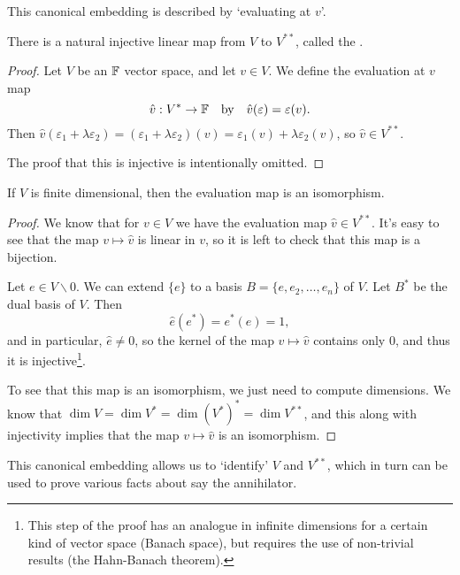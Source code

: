 \documentclass[a4paper]{scrartcl}
\begin{document}
\begin{center}
\begin{tikzpicture}[x=0.75pt,y=0.75pt,yscale=-1,xscale=1]
\end{tikzpicture}

\end{center}

This canonical embedding is described by `evaluating at $v$'.

\begin{theorem}
    There is a natural injective linear map from $V$ to $V^{**}$, called the .
\end{theorem}
\begin{proof}
Let $V$ be an $\F$ vector space, and let $v \in V$.
We define the evaluation at $v$ map
$$
\hat{v}: V^* \rightarrow \F \quad \text{by} \quad \hat{v}(\varepsilon) = \varepsilon(v).
$$
Then $\hat{v}(\varepsilon_1 + \lambda \varepsilon_2) = (\varepsilon_1 + \lambda \varepsilon_2)(v) = \varepsilon_1(v) + \lambda \varepsilon_2(v)$, so $\hat{v} \in V^{**}$.

The proof that this is injective is intentionally omitted.
\end{proof}


\begin{theorem}
    If $V$ is finite dimensional, then the evaluation map is an isomorphism.
\end{theorem}
\begin{proof}
    We know that for $v \in V$ we have the evaluation map $\hat{v} \in V^{**}$. It's easy to see that the map $v \mapsto \hat{v}$ is linear in $v$, so it is left to check that this map is a bijection.

    Let $e \in V \backslash {0}$. We can extend $\{e\}$ to a basis $B = \{e, e_2, \dots, e_n\}$ of $V$. Let $B^*$ be the dual basis of $V$. 
    Then
    $$
    \hat{e}(e^*) = e^*(e) = 1,
    $$
    and in particular, $\hat{e} \neq 0$, so the kernel of the map $v \mapsto \hat{v}$ contains only $0$, and thus it is injective\footnote{This step of the proof has an analogue in infinite dimensions for a certain kind of vector space (Banach space), but requires the use of non-trivial results (the Hahn-Banach theorem).}.

    To see that this map is an isomorphism, we just need to compute dimensions. We know that $\dim V = \dim V^* = \dim (V^*)^* = \dim V^{**}$, and this along with injectivity implies that the map $v \mapsto \hat{v}$ is an isomorphism.
\end{proof}

This canonical embedding allows us to `identify' $V$ and $V^{**}$, which in turn can be used to prove various facts about say the annihilator.
\end{document}
